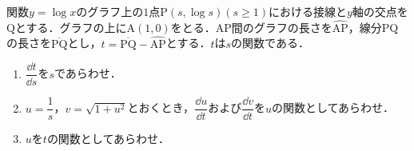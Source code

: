 \documentclass[../../main.tex]{subfiles}
\begin{document}
関数$y=\log x$のグラフ上の$1$点$\mathrm{P}(s, \log s) (s\ge 1)$における接線と$y$軸の交点を$\mathrm{Q}$とする．グラフの上に$\mathrm{A}(1,0)$をとる．$\mathrm{AP}$間のグラフの長さを$\hat{\mathrm{AP}}$，線分$\mathrm{PQ}$の長さを$\overline{\mathrm{PQ}}$とし，$t=\overline{\mathrm{PQ}}-\hat{\mathrm{AP}}$とする．$t$は$s$の関数である．

\begin{enumerate}
  \item $\dfrac{\dd t}{\dd s}$を$s$であらわせ．
  \item $u=\dfrac{1}{s}$，$v=\sqrt{1+u^2}$とおくとき，$\dfrac{\dd u}{\dd t}$および$\dfrac{\dd v}{\dd t}$を$u$の関数としてあらわせ．
  \item $u$を$t$の関数としてあらわせ．
\end{enumerate}
\end{document}
